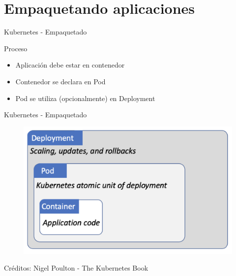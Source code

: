 \documentclass[aspectratio=169]{beamer}
\begin{document}
{
    \section{Empaquetando aplicaciones}
}


\begin{frame}{Kubernetes - Empaquetado}

            \begin{exampleblock}{Proceso}
                \begin{itemize}
                    \item Aplicación debe estar en contenedor
                    \item Contenedor se declara en Pod
                    \item Pod se utiliza (opcionalmente) en Deployment
                \end{itemize}
            \end{exampleblock}

\end{frame}

\begin{frame}{Kubernetes - Empaquetado}
    \begin{figure}
        \centering
        \includegraphics[width=0.7\linewidth]{Images/deploymentpodcontainer.png}
    \end{figure}
Créditos: Nigel Poulton - The Kubernetes Book
\end{frame}
\end{document}
